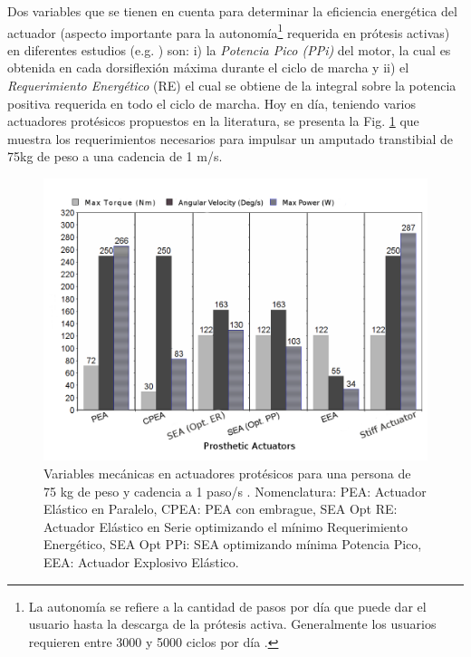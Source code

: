 \documentclass[12pt,english]{article}
\begin{document}
Dos variables que se tienen en cuenta para determinar la eficiencia
energética del actuador (aspecto importante para la autonomía\footnote{La autonomía se refiere a la cantidad de pasos por día que puede dar
el usuario hasta la descarga de la prótesis activa. Generalmente los
usuarios requieren entre 3000 y 5000 ciclos por día \cite{Grabowski2013}. } requerida
en prótesis activas) en diferentes estudios (e.g. \cite{Grimmer2012,Grimmer2014,Eslamy2013,Eslamy2014})
son: i) la \emph{Potencia Pico (PPi)}
del motor, la cual es obtenida en cada dorsiflexión máxima durante
el ciclo de marcha y ii) el \emph{Requerimiento Energético} (RE)
el cual se obtiene de la integral sobre la potencia positiva requerida
en todo el ciclo de marcha. Hoy en día, teniendo varios actuadores
protésicos propuestos en la literatura, se presenta la Fig. \ref{fig:Variables-mec=0000E1nicas-actuadores}
que muestra los requerimientos necesarios para impulsar un amputado
transtibial de 75kg de peso a una cadencia de 1 m/s.

\begin{figure}[H]
\begin{centering}
\includegraphics[scale=0.55]{20160414035751}
\par\end{centering}

\caption{\label{fig:Variables-mec=0000E1nicas-actuadores}Variables mecánicas
en actuadores protésicos para una persona de 75 kg de peso y cadencia
a 1 paso/s{\tiny{} }\cite{Cherelle2014a}. Nomenclatura: PEA: Actuador
Elástico en Paralelo, CPEA: PEA con embrague, SEA Opt RE: Actuador
Elástico en Serie optimizando el mínimo Requerimiento Energético,
SEA Opt PPi: SEA optimizando mínima Potencia Pico, EEA: Actuador Explosivo
Elástico. }
\end{figure}
\end{document}
